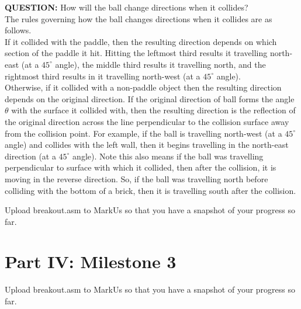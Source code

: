 \documentclass{article}
\begin{document}
\item \textbf{QUESTION: } How will the ball change directions when it collides? \\[0.4em]
The rules governing how the ball changes directions when it collides are as follows. \\[0.4em]
If it collided with the paddle, then the resulting direction depends on which section of the paddle it hit.
Hitting the leftmost third results it travelling north-east (at a $45^\circ$ angle), the middle third results it travelling north, and the rightmost third results in it travelling north-west (at a $45^\circ$ angle). \\[0.4em]
Otherwise, if it collided with a non-paddle object then the resulting direction depends on the original direction.
If the original direction of ball forms the angle $\theta$ with the surface it collided with, 
then the resulting direction is the reflection of the original direction across the line perpendicular to the collision surface away from the collision point.
For example, if the ball is travelling north-west (at a $45^\circ$ angle) and collides with the left wall, then it begins travelling in the north-east direction (at a $45^\circ$ angle).
Note this also means if the ball was travelling perpendicular to surface with which it collided, then after the collision, it is moving in the reverse direction.
So, if the ball was travelling north before colliding with the bottom of a brick, then it is travelling south after the collision.
\item Upload breakout.asm to MarkUs so that you have a snapshot of your progress so far.

\section{Part IV: Milestone 3}
\item Upload breakout.asm to MarkUs so that you have a snapshot of your progress so far.
\end{document}
